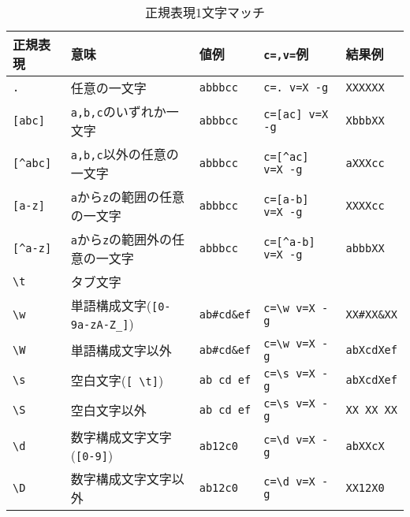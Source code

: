 \begin{table}[htbp]
\begin{center}
{\small
\caption{正規表現1文字マッチ\label{tbl:msed_regex1}}
\begin{tabular}{l|l|l|l|l}
\hline
正規表現      & 意味                                      & 値例             & \verb|c=,v=|例         & 結果例\\
\hline
\verb|.|      & 任意の一文字                               & \verb|abbbcc|   & \verb|c=. v=X -g|      & \verb|XXXXXX| \\
\verb|[abc]|	& \verb|a,b,c|のいずれか一文字               & \verb|abbbcc|   & \verb|c=[ac] v=X -g|   & \verb|XbbbXX| \\
\verb|[^abc]| & \verb|a,b,c|以外の任意の一文字             & \verb|abbbcc|   & \verb|c=[^ac] v=X -g|  & \verb|aXXXcc| \\
\verb|[a-z]|  & \verb|a|から\verb|z|の範囲の任意の一文字   & \verb|abbbcc|   & \verb|c=[a-b] v=X -g|  & \verb|XXXXcc| \\
\verb|[^a-z]| & \verb|a|から\verb|z|の範囲外の任意の一文字 & \verb|abbbcc|   & \verb|c=[^a-b] v=X -g| & \verb|abbbXX| \\
\verb|\t|     & タブ文字                                   &                 &                        & \\
\verb|\w|     & 単語構成文字(\verb|[0-9a-zA-Z_]|)          & \verb|ab#cd&ef| & \verb|c=\w v=X -g|     & \verb|XX#XX&XX| \\
\verb|\W|     & 単語構成文字以外                           & \verb|ab#cd&ef| & \verb|c=\w v=X -g|     & \verb|abXcdXef| \\
\verb|\s|     & 空白文字(\verb|[ \t]|)                     & \verb|ab cd ef| & \verb|c=\s v=X -g|     & \verb|abXcdXef|\\
\verb|\S|     & 空白文字以外                               & \verb|ab cd ef| & \verb|c=\s v=X -g|     & \verb|XX XX XX|\\
\verb|\d|     & 数字構成文字文字(\verb|[0-9]|)             & \verb|ab12c0|   & \verb|c=\d v=X -g|     & \verb|abXXcX|\\
\verb|\D|     & 数字構成文字文字以外                       & \verb|ab12c0|   & \verb|c=\d v=X -g|     & \verb|XX12X0|\\
\hline
\end{tabular} 
}
\end{center}
\end{table} 


